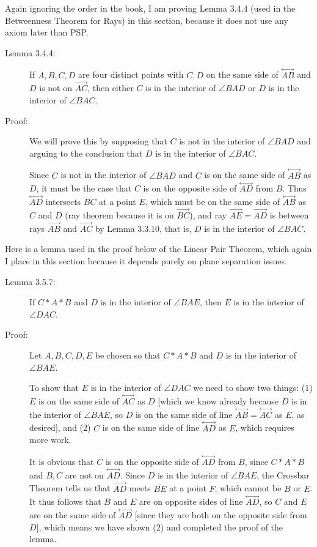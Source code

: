 \documentclass[12pt]{article}
\newcommand\Line[1]{\overset{\leftrightarrow}{#1}}
\begin{document}
Again ignoring the order in the book, I am proving Lemma 3.4.4 (used in the Betweenness Theorem for Rays) in this section, because it does not use any axiom later than PSP.

\begin{description}

\item[Lemma 3.4.4:]  If $A,B,C,D$ are four distinct points with $C,D$ on the same side of $\Line{AB}$ and $D$ is not on $\overrightarrow{AC}$, then either $C$ is in the interior of $\angle BAD$ or $D$ is in the interior of $\angle BAC$.

\item[Proof:]  We will prove this by supposing that $C$ is not in the interior of $\angle BAD$ and arguing to the conclusion that $D$ is in the interior of $\angle BAC$.

Since $C$ is not in the interior of $\angle BAD$ and $C$ is on the same side of $\Line{AB}$ as $D$, it must be the case
that $C$ is on the opposite side of $\Line{AD}$ from $B$.  Thus $\Line{AD}$ intersects $\overline{BC}$ at a point $E$, which must be on the same side of $\Line{AB}$ as $C$ and $D$ (ray theorem because it is on $\overrightarrow{BC}$),
and ray $\overrightarrow{AE}=\overrightarrow{AD}$ is between rays $\overrightarrow{AB}$ and $\overrightarrow{AC}$ by Lemma 3.3.10,
that is, $D$ is in the interior of $\angle{BAC}$.

\end{description}

Here is a lemma used in the proof below of the Linear Pair Theorem, which again I place in this section because it depends purely on plane separation issues.

\begin{description}

\item[Lemma 3.5.7:]  If $C * A * B$ and $D$ is in the interior of $\angle BAE$, then $E$ is in the interior of
$\angle DAC$.

\item[Proof:]  Let $A,B,C,D,E$ be chosen so that $C * A * B$ and $D$ is in the interior of $\angle BAE$.

To show that $E$ is in the interior of
$\angle DAC$ we need to show two things:  (1) $E$ is on the same side of $\Line{AC}$ as $D$ [which we know already because $D$ is in the interior of $\angle BAE$, so $D$ is on the same side of line $\Line{AB} = \Line{AC}$ as $E$, as desired], and (2) $C$ is on the same side of line $\Line{AD}$ as $E$, which requires more work.

It is obvious that $C$ is on the opposite side of $\Line{AD}$ from $B$, since $C*A*B$ and $B,C$ are not on $\Line{AD}$.  Since $D$ is in the interior of $\angle{BAE}$, the Crossbar Theorem tells us that $\overrightarrow{AD}$ meets $\overline{BE}$ at a point $F$, which cannot be $B$ or $E$.  It thus follows that $B$ and $E$ are on opposite sides of line
$\Line{AD}$, so $C$ and $E$ are on the same side of $\Line{AD}$ [since they are both on the opposite side from $D$], which means we have shown (2) and completed the proof of the lemma.

\end{description}
\end{document}
